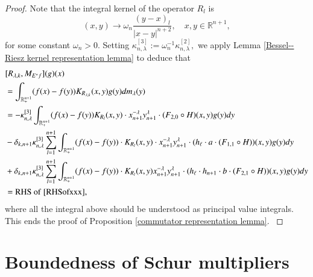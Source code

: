 \documentclass[12pt]{amsart}
\begin{document}
\begin{proof} Note that the integral kernel of the operator $R_l$ is
$$(x,y)\to\omega_n\frac{(y-x)_l}{|x-y|^{n+2}},\quad x,y\in\mathbb{R}^{n+1},$$
for some constant $\omega_{n}>0.$ Setting $\kappa_{n,\lambda}^{[3]}:=\omega_n^{-1}\kappa_{n,\lambda}^{[2]},$ we apply
Lemma \ref{Bessel--Riesz kernel representation lemma} to deduce that
{\color{blue}
\begin{align*}
&[R_{\lambda,k},M_{E^{\ast}f}](g)(x)\\&=\int_{\mathbb{R}_+^{n+1}}(f(x)-f(y))K_{R_{\lambda,k}}(x,y)g(y)dm_\lambda(y)\\
&=-\kappa^{[3]}_{n,\lambda}\int_{\mathbb{R}_+^{n+1}}(f(x)-f(y))K_{R_l}(x,y)\cdot x_{n+1}^{-\lambda}y_{n+1}^{\lambda}\cdot (F_{2,0}\circ H)(x,y)g(y)dy\\
&-\delta_{k,n+1}\kappa^{[3]}_{n,\lambda}\sum_{l=1}^{n+1}\int_{\mathbb{R}_+^{n+1}}(f(x)-f(y))\cdot K_{R_l}(x,y)\cdot x_{n+1}^{-\lambda}y_{n+1}^{\lambda}\cdot (h_\ell\cdot a\cdot (F_{1,1}\circ H))(x,y)g(y)dy\\
&+\delta_{k,n+1}\kappa^{[3]}_{n,\lambda}\sum_{l=1}^{n+1}\int_{\mathbb{R}_+^{n+1}}(f(x)-f(y))\cdot K_{R_l}(x,y)x_{n+1}^{-\lambda}y_{n+1}^{\lambda}\cdot (h_\ell\cdot h_{n+1}\cdot b\cdot (F_{2,1}\circ H))(x,y)g(y)dy\\
&={\rm RHS}\ {\rm of}\ \eqref{RHSofxxx},
\end{align*}
where all the integral above should be understood as principal value integrals. This ends the proof of Proposition \ref{commutator representation lemma}.
}




\end{proof}


\section{Boundedness of Schur multipliers}\label{Sec4}
\setcounter{equation}{0}
\end{document}
